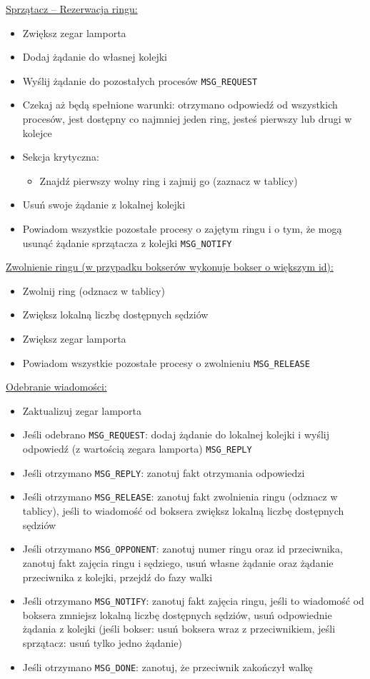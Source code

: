 \documentclass{article}
\begin{document}
\underline{Sprzątacz -- Rezerwacja ringu:}
\begin{itemize}
    \item Zwiększ zegar lamporta
    \item Dodaj żądanie do własnej kolejki
    \item Wyślij żądanie do pozostałych procesów \verb|MSG_REQUEST|
    \item Czekaj aż będą spełnione warunki: otrzymano odpowiedź od
    wszystkich procesów, jest dostępny co najmniej jeden ring, jesteś
    pierwszy lub drugi w kolejce
    \item Sekcja krytyczna:
    \begin{itemize}
        \item Znajdź pierwszy wolny ring i zajmij go (zaznacz w tablicy)
    \end{itemize}
    \item Usuń swoje żądanie z lokalnej kolejki
    \item Powiadom wszystkie pozostałe procesy o zajętym ringu i o tym,
    że mogą usunąć żądanie sprzątacza z kolejki \verb|MSG_NOTIFY|
\end{itemize}

\underline{Zwolnienie ringu (w przypadku bokserów wykonuje bokser o większym id):}
\begin{itemize}
    \item Zwolnij ring (odznacz w tablicy)
    \item Zwiększ lokalną liczbę dostępnych sędziów
    \item Zwiększ zegar lamporta
    \item Powiadom wszystkie pozostałe procesy o zwolnieniu \verb|MSG_RELEASE|
\end{itemize}

\underline{Odebranie wiadomości:}
\begin{itemize}
    \item Zaktualizuj zegar lamporta
    \item Jeśli odebrano \verb|MSG_REQUEST|: dodaj żądanie do lokalnej
    kolejki i  wyślij odpowiedź (z wartością zegara lamporta) \verb|MSG_REPLY|
    \item Jeśli otrzymano \verb|MSG_REPLY|: zanotuj fakt otrzymania
    odpowiedzi
    \item Jeśli otrzymano \verb|MSG_RELEASE|: zanotuj fakt zwolnienia
    ringu (odznacz w tablicy), jeśli to wiadomość od boksera zwiększ
    lokalną liczbę dostępnych sędziów
    \item Jeśli otrzymano \verb|MSG_OPPONENT|: zanotuj numer ringu oraz
    id przeciwnika, zanotuj fakt zajęcia ringu i sędziego, usuń własne
    żądanie oraz żądanie przeciwnika z kolejki, przejdź do fazy walki
    \item Jeśli otrzymano \verb|MSG_NOTIFY|: zanotuj fakt zajęcia ringu,
    jeśli to wiadomość od boksera zmniejsz lokalną liczbę dostępnych
    sędziów, usuń odpowiednie żądania z kolejki (jeśli bokser: usuń
    boksera wraz z przeciwnikiem, jeśli sprzątacz: usuń tylko jedno
    żądanie)
    \item Jeśli otrzymano \verb|MSG_DONE|: zanotuj, że przeciwnik
    zakończył walkę
\end{itemize}
\end{document}
